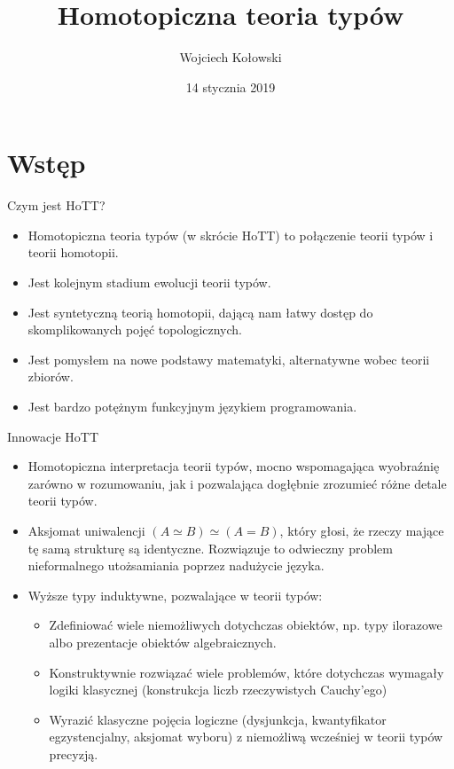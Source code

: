 \documentclass{beamer}
\title{Homotopiczna teoria typów}
\author{Wojciech Kołowski}
\date{14 stycznia 2019}
\begin{document}
\frame{\titlepage}

\frame{\tableofcontents}

\section{Wstęp}

\begin{frame}{Czym jest HoTT?}
\begin{itemize}
	\item Homotopiczna teoria typów (w skrócie HoTT) to połączenie teorii typów i teorii homotopii.
	\item Jest kolejnym stadium ewolucji teorii typów.
	\item Jest syntetyczną teorią homotopii, dającą nam łatwy dostęp do skomplikowanych pojęć topologicznych.
	\item Jest pomysłem na nowe podstawy matematyki, alternatywne wobec teorii zbiorów.
	\item Jest bardzo potężnym funkcyjnym językiem programowania.
\end{itemize}
\end{frame}

\begin{frame}{Innowacje HoTT}
\begin{itemize}
	\item Homotopiczna interpretacja teorii typów, mocno wspomagająca wyobraźnię zarówno w rozumowaniu, jak i pozwalająca dogłębnie zrozumieć różne detale teorii typów.
	\item Aksjomat uniwalencji $(A \simeq B) \simeq (A = B)$, który głosi, że rzeczy mające tę samą strukturę są identyczne. Rozwiązuje to odwieczny problem nieformalnego utożsamiania poprzez nadużycie języka.
	\item Wyższe typy induktywne, pozwalające w teorii typów:
	\begin{itemize}
		\item Zdefiniować wiele niemożliwych dotychczas obiektów, np. typy ilorazowe albo prezentacje obiektów algebraicznych.
		\item Konstruktywnie rozwiązać wiele problemów, które dotychczas wymagały logiki klasycznej (konstrukcja liczb rzeczywistych Cauchy'ego)
		\item Wyrazić klasyczne pojęcia logiczne (dysjunkcja, kwantyfikator egzystencjalny, aksjomat wyboru) z niemożliwą wcześniej w teorii typów precyzją.
	\end{itemize}
\end{itemize}
\end{frame}
\end{document}
